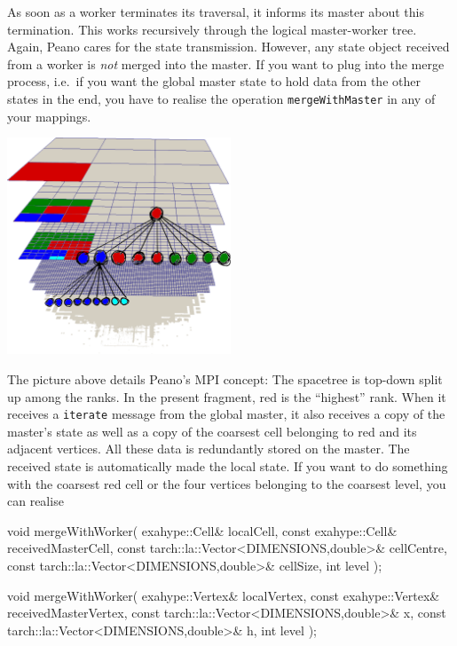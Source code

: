 As soon as a worker terminates its traversal, it informs its master about this
termination.
This works recursively through the logical master-worker tree.
Again, Peano cares for the state transmission. 
However, any state object received from a worker is {\em not} merged into the
master. 
If you want to plug into the merge process, i.e.~if you want the global master
state to hold data from the other states in the end, you have to realise the
operation \texttt{mergeWithMaster} in any of your mappings.


\begin{center}
  \includegraphics[width=0.5\textwidth]{52_mpi/spacetree-decomposition-top-down.pdf}
\end{center}

\noindent
The picture above details Peano's MPI concept:
The spacetree is top-down split up among the ranks. 
In the present fragment, red is the ``highest'' rank.
When it receives a \texttt{iterate} message from the global master, it also
receives a copy of the master's state as well as a copy of the coarsest cell
belonging to red and its adjacent vertices.
All these data is redundantly stored on the master.
The received state is automatically made the local state.
If you want to do something with the coarsest red cell or the four vertices
belonging to the coarsest level, you can realise 
\begin{code}
void mergeWithWorker(
  exahype::Cell&                               localCell, 
  const exahype::Cell&                         receivedMasterCell,
  const tarch::la::Vector<DIMENSIONS,double>&  cellCentre,
  const tarch::la::Vector<DIMENSIONS,double>&  cellSize,
  int                                          level
);

void mergeWithWorker(
  exahype::Vertex&                             localVertex,
  const exahype::Vertex&                       receivedMasterVertex,
  const tarch::la::Vector<DIMENSIONS,double>&  x,
  const tarch::la::Vector<DIMENSIONS,double>&  h,
  int                                          level
);
\end{code}

